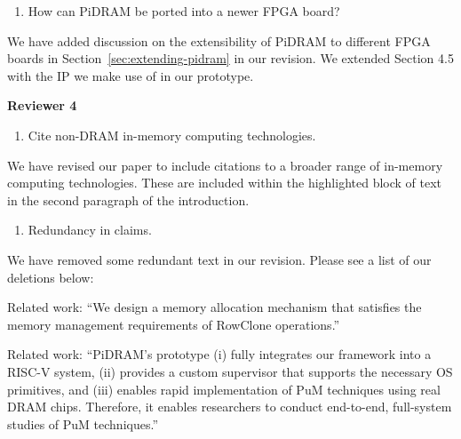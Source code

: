 \bigbreak
\begin{tcolorbox}
    \begin{enumerate}[label=R3/\arabic*]
       \addtocounter{enumi}{6}
        \item \label{q:r3q7} How can PiDRAM be ported into a newer FPGA board?
    \end{enumerate}
\end{tcolorbox} 

We have added discussion on the extensibility of PiDRAM to different FPGA boards in Section~\ref{sec:extending-pidram} in our revision. We extended Section 4.5 with the IP we make use of in our prototype.



\newpage

\noindent \textbf{\large{Reviewer 4}}

\bigbreak
\begin{tcolorbox}
    \begin{enumerate}[label=R4/\arabic*]
        \item \label{q:r4q1} Cite non-DRAM in-memory computing technologies.
    \end{enumerate}
\end{tcolorbox} 

We have revised our paper to include citations to a broader range of in-memory computing technologies. These are included within the highlighted block of text in the second paragraph of the introduction.

\bigbreak
\begin{tcolorbox}
    \begin{enumerate}[label=R4/\arabic*]
        \addtocounter{enumi}{1}
        \item \label{q:r4q2} Redundancy in claims. 
    \end{enumerate}
\end{tcolorbox} 

We have removed some redundant text in our revision. Please see a list of our deletions below:

Related work: ``We design a memory allocation mechanism that satisfies the memory management requirements of RowClone operations.''

Related work: ``PiDRAM's prototype (i) fully integrates our framework into a RISC-V system, (ii) provides a custom supervisor that supports the necessary OS primitives,  and (iii) enables rapid implementation of PuM techniques using real DRAM chips. Therefore, it enables researchers to conduct end-to-end, full-system studies of PuM techniques.''

